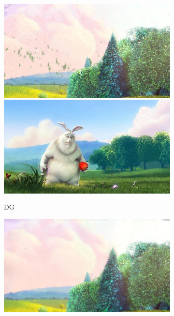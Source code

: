 \begin{figure}
	\begin{subfigure}[t]{0.135\textwidth}
		\includegraphics[width=\textwidth]{figures/stereo/bbb_frame-0004-7}\\
		\includegraphics[width=\textwidth]{figures/stereo/bbb_frame-0092-7}
		\caption{DG}
	\end{subfigure}
	\begin{subfigure}[t]{0.135\textwidth}
		\includegraphics[width=\textwidth]{figures/stereo/bbb_frame-0004-8}\\

\end{subfigure}
\end{figure}
